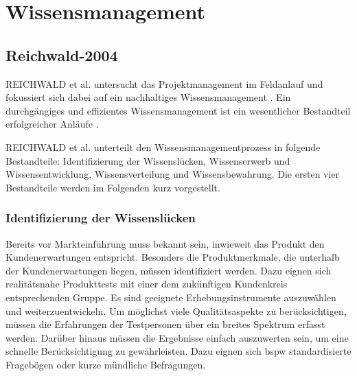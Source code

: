 \section{Wissensmanagement}
\subsection*{Reichwald-2004}
REICHWALD et al. untersucht das Projektmanagement im Feldanlauf und fokussiert sich dabei auf ein nachhaltiges Wissensmanagement \autocite{Reichwald2004}. Ein durchgängiges und effizientes Wissensmanagement ist ein wesentlicher Bestandteil erfolgreicher Anläufe \autocite{Kuhn2002}. 

REICHWALD et al. unterteilt den Wissensmanagementprozess in folgende Bestandteile: Identifizierung der Wissenslücken, Wissenserwerb und Wissensentwicklung, Wissensverteilung und Wissensbewahrung. Die ersten vier Bestandteile werden im Folgenden kurz vorgestellt. 

\subsubsection*{Identifizierung der Wissenslücken}
Bereits vor Markteinführung muss bekannt sein, inwieweit das Produkt den Kundenerwartungen entspricht. Besonders die Produktmerkmale, die unterhalb der Kundenerwartungen liegen, müssen identifiziert werden. Dazu eignen sich realitätsnahe Produkttests mit einer dem zukünftigen Kundenkreis entsprechenden Gruppe. Es sind geeignete Erhebungsinstrumente auszuwählen und weiterzuentwickeln. Um möglichst viele Qualitätsaspekte zu berücksichtigen, müssen die Erfahrungen der Testpersonen über ein breites Spektrum erfasst werden. Darüber hinaus müssen die Ergebnisse einfach auszuwerten sein, um eine schnelle Berücksichtigung zu gewährleisten. Dazu eignen sich \gls{bspw} standardisierte Fragebögen oder kurze mündliche Befragungen. 

